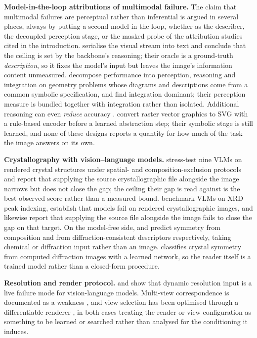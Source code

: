 \textbf{Model-in-the-loop attributions of multimodal failure.} The claim that multimodal failures are
perceptual rather than inferential is argued in several places, always by putting a second model in the loop,
whether as the describer, the decoupled perception stage, or the masked probe of the attribution studies
cited in the introduction. \citet{textoracle2512} serialise the visual stream into
text and conclude that the ceiling is set by the backbone's reasoning; their oracle is a ground-truth
\emph{description}, so it fixes the model's input but leaves the image's information content unmeasured.
\citet{mathlens2510} decompose performance into perception, reasoning and integration on geometry problems
whose diagrams and descriptions come from a common symbolic specification, and find integration dominant;
their perception measure is bundled together with integration rather than isolated. Additional reasoning can
even \emph{reduce} accuracy \citep{dual2509, cotdeg2604}. \citet{vdlm2404} convert raster vector graphics to
SVG with a rule-based encoder before a learned abstraction step; their symbolic stage is still learned, and
none of these designs reports a quantity for how much of the task the image answers on its own.

\textbf{Crystallography with vision--language models.} \citet{xcrys2506} stress-test nine VLMs on rendered
crystal structures under spatial- and com\-po\-si\-tion-exclusion protocols and report that supplying the source
crystallo\-graphic file alongside the image narrows but does not close the gap; the ceiling their gap is read
against is the best observed score rather than a measured bound. \citet{xrdbench2605} benchmark VLMs on XRD
peak indexing, establish that models fail on rendered crystallographic images, and likewise report that
supplying the source file alongside the image fails to close the gap on that target. On the model-free side,
\citet{cryspnet2003} and \citet{extinction2411} predict symmetry from composition and from
diffraction-consistent descriptors respectively, taking chemical or diffraction input rather than an image.
\citet{ziletti2018insightful} classifies crystal symmetry from computed diffraction images with a learned
network, so the reader itself is a trained model rather than a closed-form procedure.

\textbf{Resolution and render protocol.} \citet{resbench2510} and \citet{nativevis2506} show that dynamic
resolution input is a live failure mode for vision-language models. Multi-view correspondence is documented
as a weakness \citep{allangles2504}, and view selection has been optimised through a differentiable renderer
\citep{mvtn2011}, in both cases treating the render or view configuration as something to be learned or
searched rather than analysed for the conditioning it induces.

